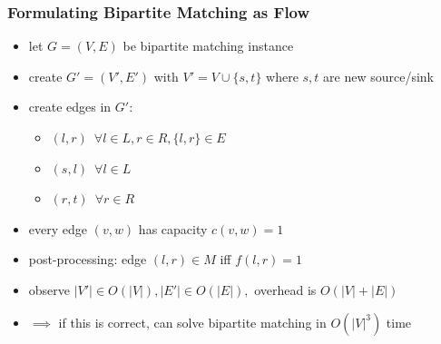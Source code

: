\documentclass[10pt,aspectratio=169]{beamer}
\begin{document}
\begin{frame} \frametitle{Formulating Bipartite Matching as Flow}
\begin{itemize}
  \item let $G=(V, E)$ be bipartite matching instance
  \item create $G'=(V', E')$ with $V' = V \cup \{s, t\}$ where $s, t$ are new
    source/sink
  \item create edges in $G'$:
  \begin{itemize}
    \item $(l, r) \enspace \forall l \in L, r \in R, \{l, r\} \in E$
    \item $(s, l) \enspace \forall l \in L$
    \item $(r, t) \enspace \forall r \in R$
  \end{itemize}
  \item every edge $(v, w)$ has capacity $c(v, w)=1$
  \item post-processing: edge $(l, r) \in M$ iff $f(l, r)=1$
  \item observe $|V'| \in O(|V|), |E'| \in O(|E|),$ overhead is $O(|V|+|E|)$
  \item $\implies$ if this is correct, can solve bipartite matching in $O(|V|^3)$ time
\end{itemize}
\end{frame}
\end{document}
